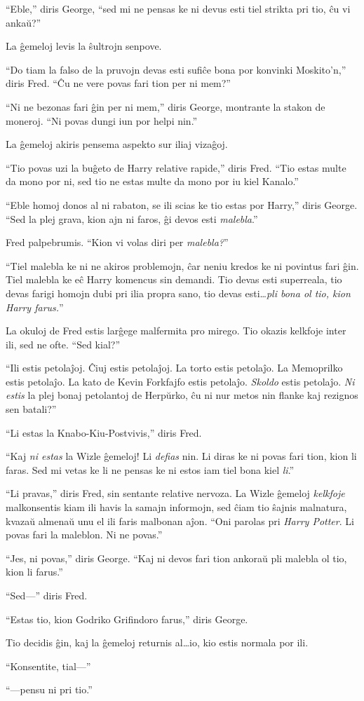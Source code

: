 ``Eble,'' diris George, ``sed mi ne pensas ke ni devus esti tiel
strikta pri tio, ĉu vi ankaŭ?''

La ĝemeloj levis la ŝultrojn senpove.

``Do tiam la falso de la pruvojn devas esti sufiĉe bona por konvinki Moskito'n,'' diris Fred. ``Ĉu ne vere povas fari tion per ni mem?''

``Ni ne bezonas fari ĝin per ni mem,'' diris George, montrante la
stakon de moneroj. ``Ni povas dungi iun por helpi nin.''

La ĝemeloj akiris pensema aspekto sur iliaj vizaĝoj.

``Tio povas uzi la buĝeto de Harry relative rapide,'' diris
Fred. ``Tio estas multe da mono por ni, sed tio ne estas multe da mono
por iu kiel Kanalo.''

``Eble homoj donos al ni rabaton, se ili scias ke tio estas por
Harry,'' diris George. ``Sed la plej grava, kion ajn ni faros, ĝi
devos esti \emph{malebla}.''

Fred palpebrumis. ``Kion vi volas diri per \emph{malebla?}''

``Tiel malebla ke ni ne akiros problemojn, ĉar neniu kredos ke ni
povintus fari ĝin. Tiel malebla ke eĉ Harry komencus sin demandi. Tio
devas esti superreala, tio devas farigi homojn dubi pri ilia propra
sano, tio devas esti\ldots{}\emph{pli bona ol tio, kion Harry
  farus.}''

La okuloj de Fred estis larĝege malfermita pro mirego. Tio okazis
kelkfoje inter ili, sed ne ofte. ``Sed kial?''

``Ili estis petolaĵoj. Ĉiuj estis petolaĵoj. La torto estis
petolaĵo. La Memoprilko estis petolaĵo. La kato de Kevin Forkfajfo
estis petolaĵo. \emph{Skoldo} estis petolaĵo. \emph{Ni estis} la plej
bonaj petolantoj de Herpŭrko, ĉu ni nur metos nin flanke kaj rezignos
sen batali?''

``Li estas la Knabo-Kiu-Postvivis,'' diris Fred.

``Kaj \emph{ni estas} la Wizle ĝemeloj! Li \emph{defias} nin. Li diras
ke ni povas fari tion, kion li faras. Sed mi vetas ke li ne pensas ke
ni estos iam tiel bona kiel \emph{li}.''

``Li pravas,'' diris Fred, sin sentante relative nervoza. La Wizle
ĝemeloj \emph{kelkfoje} malkonsentis kiam ili havis la samajn
informojn, sed ĉiam tio ŝajnis malnatura, kvazaŭ almenaŭ unu el ili
faris malbonan aĵon. ``Oni parolas pri \emph{Harry Potter}. Li povas
fari la maleblon. Ni ne povas.''

``Jes, ni povas,'' diris George. ``Kaj ni devos fari tion ankoraŭ pli
malebla ol tio, kion li farus.''

``Sed—'' diris Fred.  

``Estas tio, kion Godriko Grifindoro farus,'' diris George.

Tio decidis ĝin, kaj la ĝemeloj returnis al\ldots{}io, kio estis
normala por ili.

``Konsentite, tial—''

``—pensu ni pri tio.''

